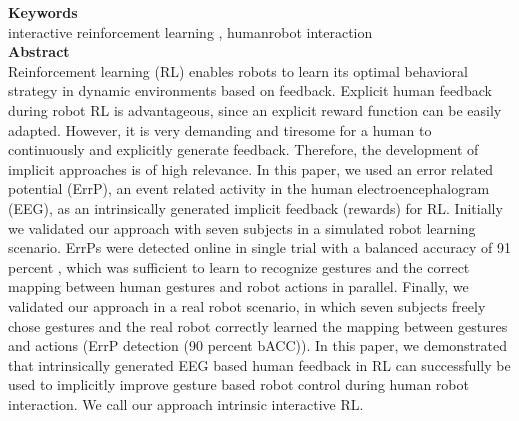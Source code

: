 \documentclass[report.tex]{subfiles}
\begin{document}
\noindent\textbf{Keywords} \\
interactive reinforcement  learning , humanrobot interaction
   \\

\noindent\textbf{Abstract} \\
Reinforcement learning (RL) enables robots to learn its optimal behavioral strategy in dynamic environments based on feedback. Explicit human feedback during robot RL is advantageous, since an explicit reward function can be easily adapted. However, it is very demanding and tiresome for a human to continuously and explicitly generate feedback. Therefore, the development of implicit approaches is of high relevance. In this paper, we used an error related potential (ErrP), an event related activity in the human electroencephalogram (EEG), as an intrinsically generated implicit feedback (rewards) for RL. Initially we validated our approach with seven subjects in a simulated robot learning scenario. ErrPs were detected online in single trial with a balanced accuracy  of 91 percent , which was sufficient to learn to recognize gestures and the correct mapping between human gestures and robot actions in parallel. Finally, we validated our approach in a real robot scenario, in which seven subjects freely chose gestures and the real robot correctly learned the mapping between gestures and actions (ErrP detection (90 percent  bACC)). In this paper, we demonstrated that intrinsically generated EEG based human feedback in RL can successfully be used to implicitly improve gesture based robot control during human robot interaction. We call our approach intrinsic interactive RL.\\
\end{document}
